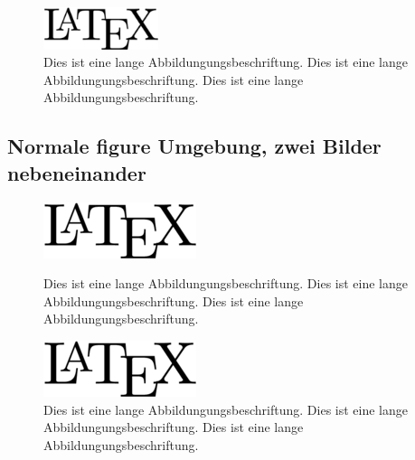 \begin{figure}[H]
   \centering
   \includegraphics[width=0.3\textwidth]{images/latex}
   \caption[Normale Figure Umgebung]{Dies ist eine lange Abbildungungsbeschriftung. Dies ist eine lange Abbildungungsbeschriftung. Dies ist eine lange Abbildungungsbeschriftung.}
\end{figure}

\subsection{Normale figure Umgebung, zwei Bilder nebeneinander}
\begin{figure}[H]
   \centering
   \begin{minipage}{0.4\linewidth}
   \includegraphics[width=1.0\linewidth]{images/latex}
   \caption[Normale Figure Umgebung]{Dies ist eine lange Abbildungungsbeschriftung. Dies ist eine lange Abbildungungsbeschriftung. Dies ist eine lange Abbildungungsbeschriftung.}
	\end{minipage}\hspace{2em}%
   \begin{minipage}{0.4\linewidth}
   \includegraphics[width=1.0\linewidth]{images/latex}
   \caption[Normale Figure Umgebung]{Dies ist eine lange Abbildungungsbeschriftung. Dies ist eine lange Abbildungungsbeschriftung. Dies ist eine lange Abbildungungsbeschriftung.}
	\end{minipage}
\end{figure}

